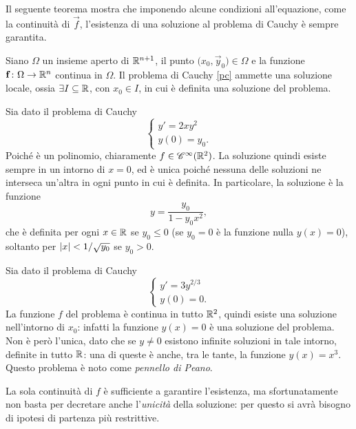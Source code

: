 Il seguente teorema mostra che imponendo alcune condizioni all'equazione, come la continuità di $\vec f$, l'esistenza di una soluzione al problema di Cauchy è sempre garantita.
\begin{teorema}[di Peano]
Siano $\Omega$ un insieme aperto di $\R^{n+1}$, il punto $\big(x_0,\vec y_0)\in\Omega$ e la funzione $\vec f\colon\Omega\to\R^n$ continua in $\Omega$. Il problema di Cauchy \eqref{pc} ammette una soluzione locale, ossia $\exists I\subseteq\R$, con $x_0\in I$, in cui è definita una soluzione del problema.
\end{teorema}
\begin{esempio} \label{es:problema-cauchy-unicita}
	Sia dato il problema di Cauchy
	\[\begin{cases}y'=2xy^2\\y(0)=y_0.\end{cases}\]
	Poiché è un polinomio, chiaramente $f\in\cont[\infty]{\R^2}$. La soluzione quindi esiste sempre in un intorno di $x=0$, ed è unica poiché nessuna delle soluzioni ne interseca un'altra in ogni punto in cui è definita. In particolare, la soluzione è la funzione
	\[
	y=\frac{y_0}{1-y_0x^2},
	\]
	che è definita per ogni $x\in\R$ se $y_0\leq 0$ (se $y_0=0$ è la funzione nulla $y(x)=0$), soltanto per $\abs{x}<1/\sqrt{y_0}$ se $y_0>0$.
\end{esempio}
\begin{esempio} \label{es:pennello-peano}
	Sia dato il problema di Cauchy
	\[\begin{cases}y'=3y^{2/3}\\y(0)=0.\end{cases}\]
	La funzione $f$ del problema è continua in tutto $\R^2$, quindi esiste una soluzione nell'intorno di $x_0$: infatti la funzione $y(x)=0$ è una soluzione del problema. Non è però l'unica, dato che se $y\neq 0$ esistono infinite soluzioni in tale intorno, definite in tutto $\R$: una di queste è anche, tra le tante, la funzione $y(x)=x^3$. Questo problema è noto come \emph{pennello di Peano}.
\end{esempio}
La sola continuità di $f$ è sufficiente a garantire l'esistenza, ma sfortunatamente non basta per decretare anche l'\emph{unicità} della soluzione: per questo si avrà bisogno di ipotesi di partenza più restrittive.

